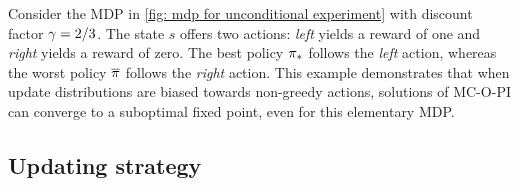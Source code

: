 \vspace{-0.2cm}

Consider the 
MDP in \autoref{fig: mdp for unconditional experiment} with discount factor $\gamma = 2/3$. The state $s$ offers two actions: \textit{left} yields a reward of one and \textit{right} yields a reward of zero. The best policy ${\pi}_*$ follows the \textit{left} action, 
whereas the worst policy $\overline{\pi}$ follows the \textit{right} action.
This example demonstrates that when update distributions are biased towards non-greedy actions, solutions of MC-O-PI can converge to a suboptimal fixed point, even for this elementary MDP.





\subsection{Updating strategy}

\vspace{-0.2cm}



